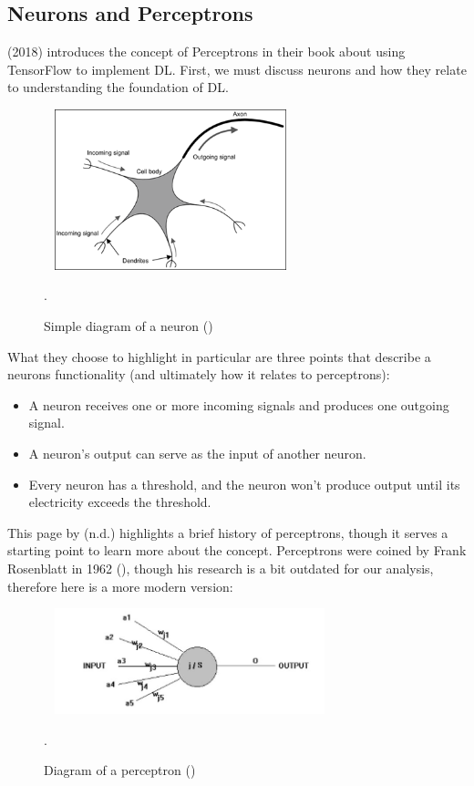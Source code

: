 \documentclass{article}
\begin{document}
\subsection{Neurons and Perceptrons}
\citeauthor{ScarpinoMatthew2018Tfd} (2018) introduces the concept of Perceptrons in their book about using TensorFlow 
to implement DL. First, we must discuss neurons and how they relate to understanding the foundation of DL.
\begin{figure}[h]\
    \centering
    \includegraphics[width=0.6\textwidth]{neuron.png}
    \caption{Simple diagram of a neuron (\cite{ScarpinoMatthew2018Tfd})}.
\end{figure}
\break
What they choose to highlight in particular are three points that describe a neurons functionality (and ultimately how 
it relates to perceptrons):
\begin{itemize}
    \item A neuron receives one or more incoming signals and produces one outgoing signal.
    \item A neuron’s output can serve as the input of another neuron.
    \item Every neuron has a threshold, and the neuron won’t produce output until its electricity exceeds the threshold.
\end{itemize}
This page by \citeauthor{anonpercep} (n.d.) highlights a brief history of perceptrons, though 
it serves a starting point to learn more about the concept. Perceptrons were coined by Frank Rosenblatt in 1962  
(\cite{rosenblatt1961principles}), though his research is a bit outdated for our analysis, therefore here is a 
more modern version:
\begin{figure}[h]\
    \centering
    \includegraphics[width=0.7\textwidth]{perceptron.jpg}
    \caption{Diagram of a perceptron (\cite{anonpercep})}.
\end{figure}
\end{document}
